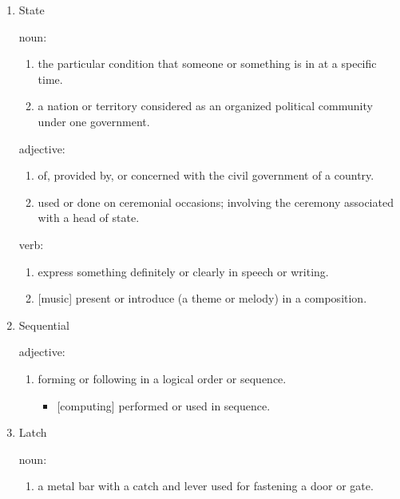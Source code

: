 \documentclass[12pt]{article}
\begin{document}
\begin{enumerate}
    \item State

    noun:

    \begin{enumerate}
        \item the particular condition that someone or something is in at a specific time.
        \item a nation or territory considered as an organized political community under one government.
    \end{enumerate}

    adjective:

    \begin{enumerate}
        \item of, provided by, or concerned with the civil government of a country.
        \item used or done on ceremonial occasions; involving the ceremony associated with a head of state.
    \end{enumerate}

    verb:

    \begin{enumerate}
        \item express something definitely or clearly in speech or writing.
        \item {[music]} present or introduce (a theme or melody) in a composition.
    \end{enumerate}

    \item Sequential

    adjective:

    \begin{enumerate}
        \item forming or following in a logical order or sequence.

        \begin{itemize}
            \item {[computing]} performed or used in sequence.
        \end{itemize}
    \end{enumerate}

    \item{Latch}

    noun:

    \begin{enumerate}
        \item a metal bar with a catch and lever used for fastening a door or gate.
    \end{enumerate}


\end{enumerate}
\end{document}

